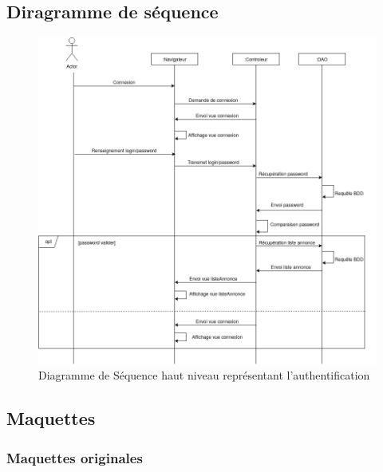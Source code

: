 \documentclass[a4paper,11pt]{article}
\begin{document}
\subsection{Diragramme de séquence}

\begin{figure}[H]
  \includegraphics[width=\linewidth]{../Conception/DS_Connexion.png}
  \caption{Diagramme de Séquence haut niveau représentant l'authentification}
  \label{fig:ds-connexion}
\end{figure}

\subsection{Maquettes}
\label{sec:maquettes-annexe}

\subsubsection{Maquettes originales}
\end{document}
